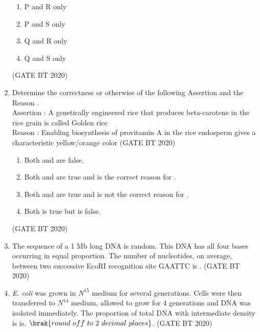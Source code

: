\documentclass[journal,12pt,onecolumn]{IEEEtran}
\theoremstyle{remark}
\begin{document}
\begin{enumerate}[label=Q\arabic*:, start=26, leftmargin=2em]
\begin{multicols}{2}
\begin{enumerate}[label=\alph*)]

\item P and R only
\item P and S only
\item Q and R only 
\item Q and S only
\end{enumerate}

\end{multicols}
\hfill(GATE BT 2020)


 \item Determine the correctness or otherwise of the following Assertion  and the Reason
.\\
Assertion : A genetically engineered rice that produces beta-carotene in the rice grain is called Golden rice\\
Reason : Enabling biosynthesis of provitamin A in the rice endosperm gives a characteristic yellow/orange color \hfill(GATE BT 2020)\\

\begin{enumerate}[label=\alph*)]

\item \;Both   and  are false.
\item\;Both  and  are true and  is the correct reason for .
\item\;Both  and  are true and  is not the correct reason for .
\item\;Both  is true but  is  false.
\end{enumerate}

\hfill(GATE BT 2020)


\item The sequence of a 1 Mb long DNA is random. This DNA has all four bases
occurring in equal proportion. The number of nucleotides, on average, between two successive EcoRI recognition site GAATTC is  . \hfill(GATE BT 2020)\\

\item \textit{E. coli} was grown in $N^{15}$ medium for several generations. Cells were then transferred to $N^{14}$ medium, allowed to grow for 4 generations and DNA was isolated immediately. The proportion of total DNA with intermediate density is is.
$\brak{round \ off \ to \ 2 \ decimal\ places}$. \hfill(GATE BT 2020)\\


\end{enumerate}
\end{document}
